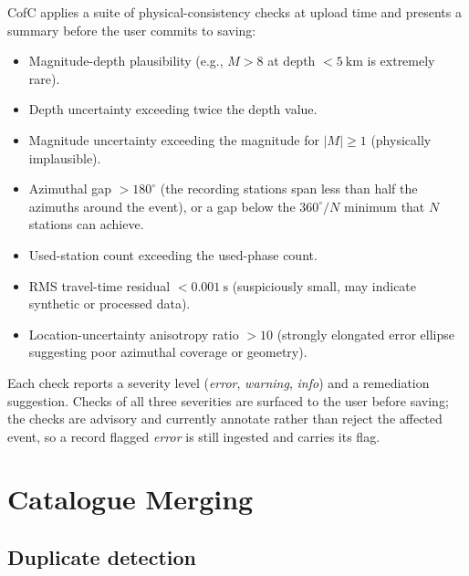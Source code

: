 \documentclass[12pt]{article}
\begin{document}
CofC applies a suite of physical-consistency checks at upload time and
presents a summary before the user commits to saving:
\begin{itemize}[leftmargin=*]
  \item Magnitude-depth plausibility (e.g., $M > 8$ at depth $< \SI{5}{\km}$
    is extremely rare).
  \item Depth uncertainty exceeding twice the depth value.
  \item Magnitude uncertainty exceeding the magnitude for $|M| \geq 1$
    (physically implausible).
  \item Azimuthal gap $> 180^{\circ}$ (the recording stations span less than
    half the azimuths around the event), or a gap below the $360^{\circ}/N$
    minimum that $N$ stations can achieve.
  \item Used-station count exceeding the used-phase count.
  \item RMS travel-time residual $< \SI{0.001}{\s}$ (suspiciously small, may
    indicate synthetic or processed data).
  \item Location-uncertainty anisotropy ratio $> 10$ (strongly elongated error
    ellipse suggesting poor azimuthal coverage or geometry).
\end{itemize}
Each check reports a severity level (\textit{error}, \textit{warning},
\textit{info}) and a remediation suggestion.  Checks of all three severities are
surfaced to the user
before saving; the checks are advisory and currently annotate rather than reject
the affected event, so a record flagged \textit{error} is still ingested and
carries its flag.

\section{Catalogue Merging}
\label{sec:merge}

\subsection{Duplicate detection}
\end{document}
